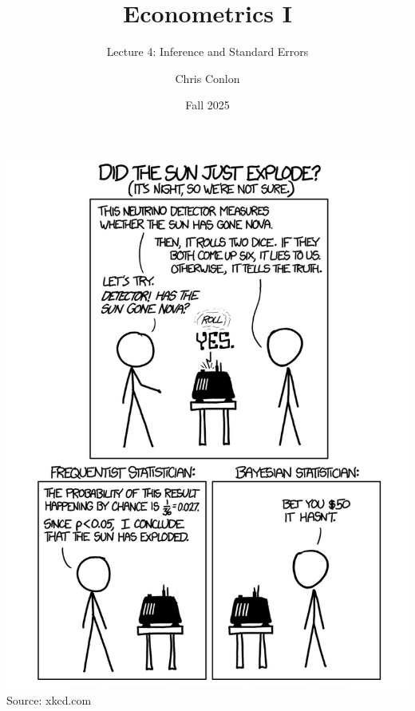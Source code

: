 






\title[L4 - Inference and Standard Errors]{ Econometrics I}
\subtitle{Lecture 4: Inference and Standard Errors}
\author{Chris Conlon}
\date{Fall 2025}
\maketitle


\begin{frame}
\begin{center}
\includegraphics[height=.92\textheight]{explode} \\
{\tiny Source: xkcd.com}
\end{center}
\end{frame}



